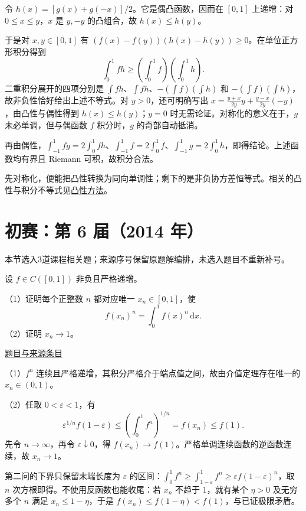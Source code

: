 \documentclass[UTF8,12pt,a4paper,fontset=fandol]{ctexart}
\begin{document}
\begin{solve}\label{ans:pre05-math:5}

令 $h(x)=[g(x)+g(-x)]/2$。它是偶凸函数，因而在 $[0,1]$ 上递增：对 $0\le x\le y$，$x$ 是 $y,-y$ 的凸组合，故 $h(x)\le h(y)$。

于是对 $x,y\in[0,1]$ 有 $(f(x)-f(y))(h(x)-h(y))\ge0$。在单位正方形积分得到
\[
\int_0^1fh\ge\left(\int_0^1f\right)\left(\int_0^1h\right).
\]
二重积分展开的四项分别是 $\int fh$、$\int fh$、$-(\int f)(\int h)$ 和 $-(\int f)(\int h)$，故非负性恰好给出上述不等式。对 $y>0$，还可明确写出 $x=\frac{y+x}{2y}y+\frac{y-x}{2y}(-y)$，由凸性与偶性得到 $h(x)\le h(y)$；$y=0$ 时无需论证。对称化的意义在于，$g$ 未必单调，但与偶函数 $f$ 积分时，$g$ 的奇部自动抵消。

再由偶性，$\int_{-1}^1fg=2\int_0^1fh$、$\int_{-1}^1f=2\int_0^1f$、$\int_{-1}^1g=2\int_0^1h$，即得结论。上述函数均有界且 Riemann 可积，故积分合法。

\end{solve}

\begin{remark}[方法与条件]先对称化，便能把凸性转换为同向单调性；剩下的是非负协方差恒等式。相关的凸性与积分不等式见\hyperref[app:estimate-convexity]{凸性方法}。\end{remark}

\section{初赛：第 6 届（2014 年）}

本节选入3道课程相关题；来源序号保留原题解编排，未选入题目不重新补号。

\begin{example}[来源序号2]\label{ex:pre06-math:2}\label{pr:pre06-math:2}

设 $f\in C([0,1])$ 非负且严格递增。

（1）证明每个正整数 $n$ 都对应唯一 $x_n\in[0,1]$，使
\[
f(x_n)^n=\int_0^1f(x)^n\,\mathrm dx.
\]
（2）证明 $x_n\to1$。

\par\href{https://github.com/lzxcr/cmc-mathematics/blob/64916fa1fdbc3e444a652eca204d5669058ee321/src/problems/preliminary/06/02.md}{题目与来源条目}

\end{example}

\begin{solve}\label{ans:pre06-math:2}

（1）$f^n$ 连续且严格递增，其积分严格介于端点值之间，故由介值定理存在唯一的 $x_n\in(0,1)$。

（2）任取 $0<\varepsilon<1$，有
\[
\varepsilon^{1/n}f(1-\varepsilon)
\le\left(\int_0^1f^n\right)^{1/n}=f(x_n)\le f(1).
\]
先令 $n\to\infty$，再令 $\varepsilon\downarrow0$，得 $f(x_n)\to f(1)$。严格单调连续函数的逆函数连续，故 $x_n\to1$。

第二问的下界只保留末端长度为 $\varepsilon$ 的区间：$\int_0^1 f^n\ge\int_{1-\varepsilon}^1f^n\ge\varepsilon f(1-\varepsilon)^n$，取 $n$ 次方根即得。不使用反函数也能收尾：若 $x_n$ 不趋于 $1$，就有某个 $\eta>0$ 及无穷多个 $n$ 满足 $x_n\le1-\eta$，于是 $f(x_n)\le f(1-\eta)<f(1)$，与已证极限矛盾。

\end{solve}
\end{document}
